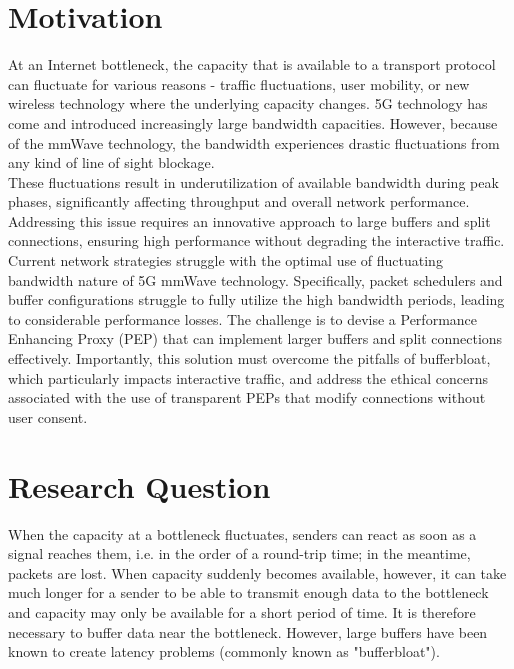\documentclass[a4paper,english, 12pt]{report}
\begin{document}
\section{Motivation}
At an Internet bottleneck, the capacity that is available to a transport protocol can fluctuate for various reasons - traffic fluctuations, user mobility, or new wireless technology where the underlying capacity changes. 5G technology has come and introduced increasingly large bandwidth capacities\cite{Agrawal_Sharma_2016}. However, because of the mmWave technology, the bandwidth experiences drastic fluctuations from any kind of line of sight blockage\cite{mmwave_blocking}.\\ These fluctuations result in underutilization of available bandwidth during peak phases, significantly affecting throughput and overall network performance. Addressing this issue requires an innovative approach to large buffers and split connections, ensuring high performance without degrading the interactive traffic.\\

Current network strategies struggle with the optimal use of fluctuating bandwidth nature of 5G mmWave technology\cite{Srivastava_Fund_Panwar_2020}. Specifically, packet schedulers and buffer configurations struggle to fully utilize the high bandwidth periods, leading to considerable performance losses. The challenge is to devise a Performance Enhancing Proxy (PEP) that can implement larger buffers and split connections effectively. Importantly, this solution must overcome the pitfalls of bufferbloat\cite{hingane2020aqm}, which particularly impacts interactive traffic, and address the ethical concerns associated with the use of transparent PEPs that modify connections without user consent.

\section{Research Question}
When the capacity at a bottleneck fluctuates, senders can react as soon as a signal reaches them, i.e. in the order of a round-trip time; in the meantime, packets are lost. When capacity suddenly becomes available, however, it can take much longer for a sender to be able to transmit enough data to the bottleneck and capacity may only be available for a short period of time. It is therefore necessary to buffer data near the bottleneck. However, large buffers have been known to create latency problems (commonly known as "bufferbloat").\\
\end{document}
